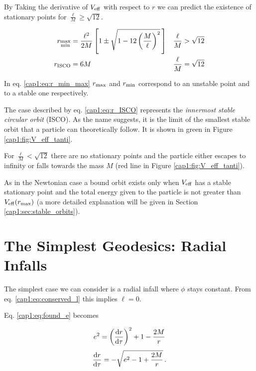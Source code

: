 By Taking the derivative of $V_{\rm eff}$ with respect to $r$ we can predict the
existence of stationary points for $\frac{\ell}{M} \geq \sqrt{12}$.

\begin{subequations}
\begin{align}
    r_{\substack{\rm max \\ \rm min}} &= \frac{\ell^2}{2 M} \left[1 \pm
    \sqrt{1 - 12 \left( \frac{M}{\ell} \right)^2} \, \right]
    &&\frac{\ell}{M} > \sqrt{12} \label{cap1:eq:r_min_max} \\
    r_{\rm ISCO} &= 6 M
    &&\frac{\ell}{M} = \sqrt{12} \label{cap1:eq:r_ISCO}
\end{align}
\label{cap1:eq:stationary_r}
\end{subequations}

In eq. \ref{cap1:eq:r_min_max} $r_{\rm max}$ and $r_{\rm min}$ correspond
to an unstable point and to a stable one respectively.

The case described by eq. \ref{cap1:eq:r_ISCO} represents the
\textit{innermost stable circular orbit} (ISCO).
As the name suggests, it is the limit of the smallest stable orbit that a
particle can theoretically follow.
It is shown in green in Figure \ref{cap1:fig:V_eff_tanti}.

For $\frac{\ell}{M} < \sqrt{12}$ there are no stationary points and the particle
either escapes to infinity or falls towards the mass $M$ (red line in Figure
\ref{cap1:fig:V_eff_tanti}).

As in the Newtonian case a bound orbit exists only when $V_{\rm eff}$ has a
stable stationary point and the total energy given to the particle is not
greater than $V_{\rm eff}(r_{\rm max})$ (a more detailed explanation will be given in
Section \ref{cap1:sec:stable_orbits}).


\section{The Simplest Geodesics: Radial Infalls}

The simplest case we can consider is a radial infall where $\phi$
stays constant.
From eq. \ref{cap1:eq:conserved_l} this implies $\ell = 0$.

Eq. \ref{cap1:eq:found_e} becomes


\begin{equation*}
    e^2 = \left(\dv{r}{\tau}\right)^2 + 1 - \frac{2M}{r}
\end{equation*}
\begin{equation}
    \dv{r}{\tau} = - \sqrt{e^2 - 1 + \frac{2 M}{r}} \, .
    \label{cap1:eq:radial_infall_ODE_1}
\end{equation}

